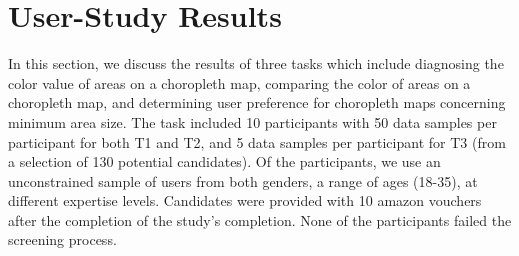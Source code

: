 \section{User-Study Results} \label{sec:results}
In this section, we discuss the results of three tasks which include diagnosing the color value of areas on a choropleth map, comparing the color of areas on a choropleth map, and determining user preference for choropleth maps concerning minimum area size. The task included 10 participants with 50 data samples per participant for both T1 and T2, and 5 data samples per participant for T3 (from a selection of 130 potential candidates). Of the participants, we use an unconstrained sample of users from both genders, a range of ages (18-35), at different expertise levels. Candidates were provided with {\textsterling}10 amazon vouchers after the completion of the study's completion. None of the participants failed the screening process. 
